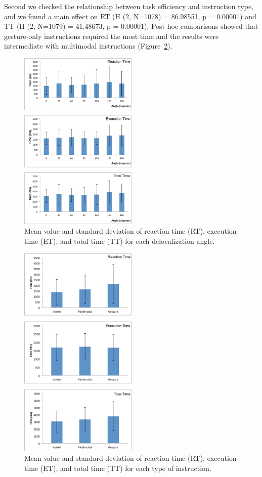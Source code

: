 Second we checked the relationship between task efficiency and instruction type, and we found a main effect on RT (H (2, N=1078) = 86.98551, p = 0.00001) and TT (H (2, N=1079) = 41.48673, p = 0.00001). Post hoc comparisons showed that gesture-only instructions required the most time and the results were intermediate with multimodal instructions (Figure~\ref{fig:2_instruction}).

\begin{figure}[tb]
  \centering
  \includegraphics[width=0.5\textwidth]{figures/2_angles}
  \caption{\label{fig:2_angles}Mean value and standard deviation of reaction time (RT), execution time (ET), and total time (TT) for each delocalization angle.}
\end{figure}

\begin{figure}[tb]
  \centering
  \includegraphics[width=0.5\textwidth]{figures/2_instruction}
  \caption{\label{fig:2_instruction}Mean value and standard deviation of reaction time (RT), execution time (ET), and total time (TT) for each type of instruction.}
\end{figure}

